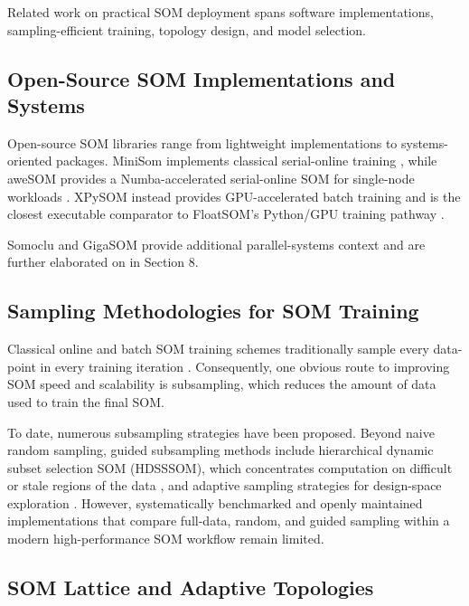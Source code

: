 \documentclass[10pt]{article} %
\begin{document}
Related work on practical SOM deployment spans software implementations, sampling-efficient training, topology design, and model selection.

\subsection{Open-Source SOM Implementations and Systems}

Open-source SOM libraries range from lightweight implementations to systems-oriented packages. MiniSom implements classical serial-online training \citep{vettigliJustGlowingMinisom2018}, while aweSOM provides a Numba-accelerated serial-online SOM for single-node workloads \citep{haAweSOMCPUGPUaccelerated2025}. XPySOM instead provides GPU-accelerated batch training and is the closest executable comparator to FloatSOM's Python/GPU training pathway \citep{manciniXPySomHighPerformanceSelfOrganizing2020}.

Somoclu and GigaSOM provide additional parallel-systems context \citep{wittekSomocluEfficientParallel2017,kratochvilGigaSOMjlHighperformanceClustering2020} and are further elaborated on in Section 8.

\subsection{Sampling Methodologies for SOM Training}

Classical online and batch SOM training schemes traditionally sample every data-point in every training iteration \citep{kohonenSelfOrganizingMaps2001,liuRobustPhenotypingHighly2023}. Consequently, one obvious route to improving SOM speed and scalability is subsampling, which reduces the amount of data used to train the final SOM.

To date, numerous subsampling strategies have been proposed. Beyond naive random sampling, guided subsampling methods include hierarchical dynamic subset selection SOM (HDSSSOM), which concentrates computation on difficult or stale regions of the data \citep{wetmoreSpeedingSelfOrganizingFeature2005}, and adaptive sampling strategies for design-space exploration \citep{itoDesignSpaceExploration2016}. However, systematically benchmarked and openly maintained implementations that compare full-data, random, and guided sampling within a modern high-performance SOM workflow remain limited.

\subsection{SOM Lattice and Adaptive Topologies}
\end{document}
